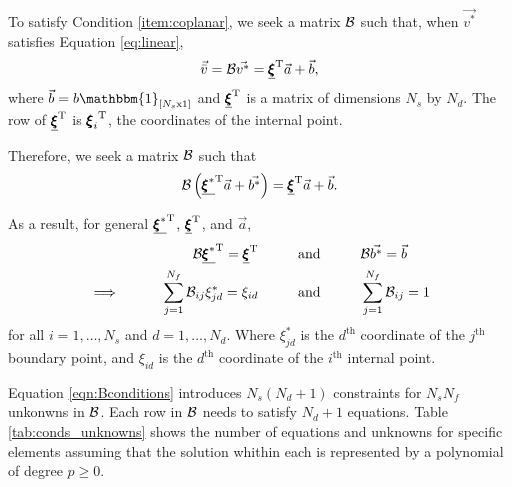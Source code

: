 To satisfy Condition \ref{item:coplanar}, we seek a matrix $\mathcal{B}$ such that, when $\vec{v^*}$ satisfies Equation \ref{eq:linear},
\begin{equation}
\vec{\bar{v}} = \mathcal{B}\vec{v^*} = \underline{{\pmb \xi}}^\mathrm{T} \vec{a} + \vec{b},
\end{equation}
where $\vec{b} = b\mathbbm{1}_{[N_s \mathrm{x} 1]}$ and $\underline{{\pmb \xi}}^\mathrm{T}$ is a matrix of dimensions $N_s$ by $N_d$. The \ith row of $\underline{{\pmb \xi}}^\mathrm{T}$ is ${{\pmb \xi}_i}^\mathrm{T}$, the coordinates of the \ith internal point.

Therefore, we seek a matrix $\mathcal{B}$ such that
\begin{equation}
\mathcal{B}\left(\underline{{\pmb \xi}^*}^\mathrm{T}\vec{a} + \vec{b^*}\right) = \underline{{\pmb \xi}}^\mathrm{T} \vec{a} + \vec{b}.
\end{equation}

As a result, for general $ \underline{{\pmb \xi}^*}^\mathrm{T}$, $\underline{{\pmb \xi}}^\mathrm{T} $, and $\vec{a}$,
\begin{align}
\mathcal{B}\underline{{\pmb \xi}^*}^\mathrm{T} = \underline{{\pmb \xi}}^\mathrm{T}  \hspace{1cm} &\text{and} \hspace{1cm} \mathcal{B}\vec{b^*} = \vec{b}\\
\label{eqn:Bconditions}\implies \hspace{1cm} \sum_{j=1}^{N_f}\mathcal{B}_{ij}\xi^*_{jd} = \xi_{id} \hspace{1cm} &\text{and} \hspace{1cm} \sum_{j = 1}^{N_f} \mathcal{B}_{ij} = 1
\end{align}
for all $i = 1,\dots,N_s$ and $d = 1,\dots,N_d$. Where $\xi^*_{jd}$ is the $d^\text{th}$ coordinate of the $j^\text{th}$ boundary point, and $\xi_{id}$ is the $d^\text{th}$ coordinate of the $i^\text{th}$ internal point.

Equation \ref{eqn:Bconditions} introduces $N_s (N_d + 1)$ constraints for $N_sN_f$ unkonwns in $\mathcal{B}$. Each row in $\mathcal{B}$ needs to satisfy $N_d+1$ equations. Table \ref{tab:conds_unknowns} shows the number of equations and unknowns for specific elements assuming that the solution whithin each is represented by a polynomial of degree $p\ge0$.

\newcommand{\len}{0.6cm}

